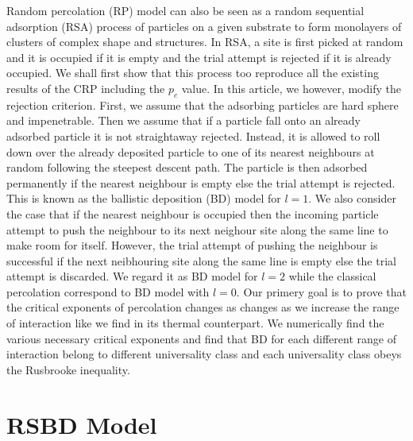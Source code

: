 ﻿\documentclass[twocolumn,showpacs,preprintnumbers,amsmath,amssymb]{revtex4}
\begin{document}
Random percolation (RP) model can also be seen as a random sequential adsorption (RSA) process of particles on a given 
substrate to form
monolayers of clusters of complex shape and structures. In RSA, a site is first picked at random and it is occupied
if it is empty and the trial attempt is rejected if it is already occupied.
We shall first show that this process too reproduce all the existing results of the CRP 
including the $p_c$ value. In this article, we however, modify the rejection criterion. First,
 we assume that the adsorbing
particles are hard sphere and impenetrable. Then we assume that if a 
particle fall onto an already adsorbed particle it is not straightaway rejected. Instead, it is allowed to roll down 
over the already deposited
particle to one of its nearest neighbours at random following the steepest descent path. 
The particle is then adsorbed permanently if the nearest neighbour is empty 
else the trial attempt is rejected. This is known as the ballistic deposition (BD) model for $l=1$. We also consider
the case that if the nearest neighbour is occupied then the incoming particle attempt to push the neighbour
to its next neighour site along the same line to make room for itself. However, the trial attempt of pushing 
the neighbour is successful if the next neibhouring site along the same line is empty else the trial
attempt is discarded. We regard it as BD model for $l=2$ while the classical percolation correspond to BD
model with $l=0$. Our primery goal is to prove that the critical exponents of percolation changes
as changes as we increase the range of interaction like we find in its thermal counterpart. We numerically 
find the various necessary critical exponents and find that BD for each different range of interaction 
belong to different universality class and each universality class obeys the Rusbrooke inequality.  

\section{RSBD Model}
\end{document}
